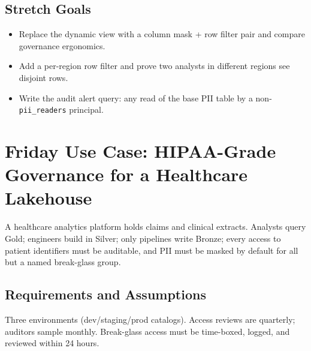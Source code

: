 \subsection*{Stretch Goals}
\begin{itemize}
    \item Replace the dynamic view with a column mask + row filter pair and compare governance ergonomics.
    \item Add a per-region row filter and prove two analysts in different regions see disjoint rows.
    \item Write the audit alert query: any read of the base PII table by a non-\texttt{pii\_readers} principal.
\end{itemize}

\section{Friday Use Case: HIPAA-Grade Governance for a Healthcare Lakehouse}
A healthcare analytics platform holds claims and clinical extracts. Analysts query Gold; engineers build in Silver; only pipelines write Bronze; every access to patient identifiers must be auditable, and PII must be masked by default for all but a named break-glass group.

\subsection{Requirements and Assumptions}
Three environments (dev/staging/prod catalogs). Access reviews are quarterly; auditors sample monthly. Break-glass access must be time-boxed, logged, and reviewed within 24 hours.

